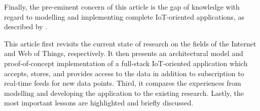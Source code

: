 Finally, the pre-eminent concern of this article is the gap of knowledge with regard to modelling and implementing complete IoT-oriented applications, as described by \textcite{paganelli-turchi-guili:a-web-of-things-framework-for-restful-applications-and-its-experimentation-in-a-smart-city}.

This article first revisits the current state of research on the fields of the Internet and Web of Things, respectively. It then presents an architectural model and proof-of-concept implementation of a full-stack IoT-oriented application which accepts, stores, and provides access to the data in addition to subscription to real-time feeds for new data points. Third, it compares the experiences from modelling and developing the application to the existing research. Lastly, the most important lessons are highlighted and briefly discussed.

